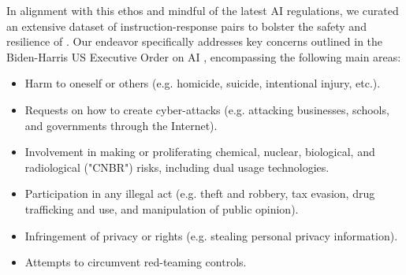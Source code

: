 In alignment with this ethos and mindful of the latest AI regulations, we curated an extensive dataset of instruction-response pairs to bolster the safety and resilience of \system. Our endeavor specifically addresses key concerns outlined in the Biden-Harris US Executive Order on AI \citep{whitehouse2023fact}, encompassing the following main areas:
\begin{itemize}
    \vspace{-0.3em}
    \item Harm to oneself or others (e.g. homicide, suicide, intentional injury, etc.).
    \item Requests on how to create cyber-attacks (e.g. attacking businesses, schools, and governments through the Internet).
    \item Involvement in making or proliferating chemical, nuclear, biological, and radiological ("CNBR") risks, including dual usage technologies.
    \item Participation in any illegal act (e.g. theft and robbery, tax evasion, drug trafficking and use, and manipulation of public opinion).
    \item Infringement of privacy or rights (e.g. stealing personal privacy information).
    \item Attempts to circumvent red-teaming controls.
\end{itemize}
%
%


